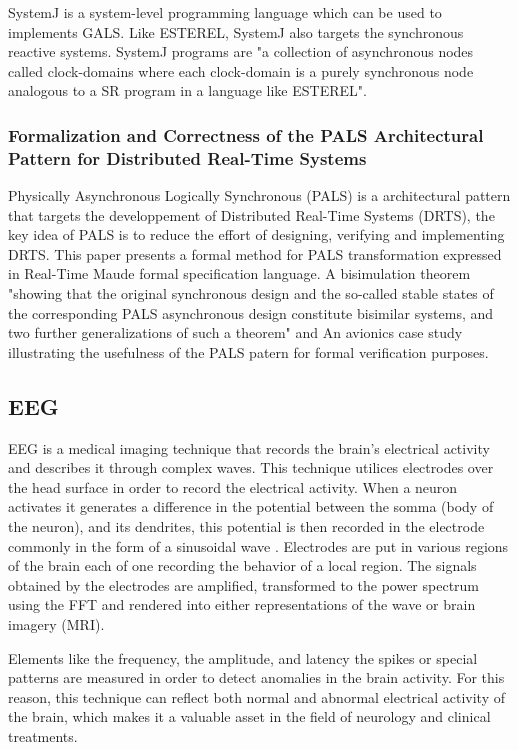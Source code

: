 SystemJ is a system-level programming language which can be used to implements GALS. Like ESTEREL, SystemJ also targets the synchronous reactive systems. SystemJ programs are "a collection of asynchronous nodes called clock-domains where each clock-domain is a purely synchronous node analogous to a SR program in a language like ESTEREL".

\subsubsection{Formalization and Correctness of the PALS Architectural Pattern for Distributed Real-Time Systems}

Physically Asynchronous Logically Synchronous (PALS) is a architectural pattern that targets the developpement of Distributed Real-Time Systems (DRTS), the key idea of PALS is to reduce the effort of designing, verifying and implementing DRTS. This paper presents a formal method for PALS transformation expressed in Real-Time Maude formal specification language. A bisimulation theorem "showing that the original synchronous design and
the so-called stable states of the corresponding PALS asynchronous design constitute bisimilar systems, and two further generalizations of such a theorem" and An avionics case study illustrating the usefulness of the PALS patern for formal verification purposes.

\subsection{EEG}

EEG is a medical imaging technique that records the brain’s electrical activity and describes it through complex waves.  This technique utilices electrodes over the head surface in order to record the electrical activity. When a neuron activates it generates a difference in the potential between the somma (body of the neuron), and its dendrites, this potential is then recorded in the electrode commonly in the form of a sinusoidal wave \cite{EEGfundamentals}. Electrodes are put in various regions of the brain each of one recording the behavior of a local region. The signals obtained by the electrodes are amplified, transformed to the power spectrum using the FFT and rendered into either representations of the wave or brain imagery (MRI).

Elements like the frequency, the amplitude, and latency the spikes or special patterns  are measured  in order to detect anomalies in the brain activity. For this reason, this technique can reflect both normal and abnormal electrical activity of the brain, which makes it a valuable asset in the field of neurology and clinical treatments. 

